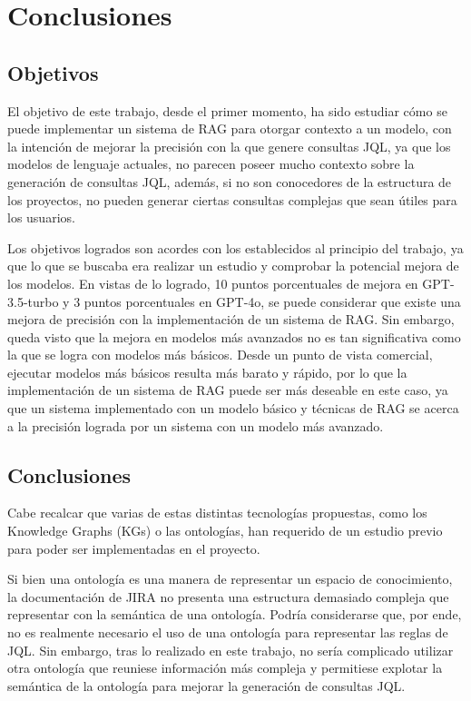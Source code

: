 \section{Conclusiones}
\subsection{Objetivos}
El objetivo de este trabajo, desde el primer momento, ha sido estudiar cómo se puede implementar un sistema de RAG para otorgar contexto a un modelo, con la intención de mejorar la precisión con la que genere consultas JQL, ya que los modelos de lenguaje actuales, no parecen poseer mucho contexto sobre la generación de consultas JQL, además, si no son conocedores de la estructura de los proyectos, no pueden generar ciertas consultas complejas que sean útiles para los usuarios.

Los objetivos logrados son acordes con los establecidos al principio del trabajo, ya que lo que se buscaba era realizar un estudio y comprobar la potencial mejora de los modelos. En vistas de lo logrado, 10 puntos porcentuales de mejora en GPT-3.5-turbo y 3 puntos porcentuales en GPT-4o, se puede considerar que existe una mejora de precisión con la implementación de un sistema de RAG. Sin embargo, queda visto que la mejora en modelos más avanzados no es tan significativa como la que se logra con modelos más básicos. Desde un punto de vista comercial, ejecutar modelos más básicos resulta más barato y rápido, por lo que la implementación de un sistema de RAG puede ser más deseable en este caso, ya que un sistema implementado con un modelo básico y técnicas de RAG se acerca a la precisión lograda por un sistema con un modelo más avanzado.

\subsection{Conclusiones}
Cabe recalcar que varias de estas distintas tecnologías propuestas, como los Knowledge Graphs (KGs) o las ontologías, han requerido de un estudio previo para poder ser implementadas en el proyecto.

Si bien una ontología es una manera de representar un espacio de conocimiento, la documentación de JIRA no presenta una estructura demasiado compleja que representar con la semántica de una ontología. Podría considerarse que, por ende, no es realmente necesario el uso de una ontología para representar las reglas de JQL. Sin embargo, tras lo realizado en este trabajo, no sería complicado utilizar otra ontología que reuniese información más compleja y permitiese explotar la semántica de la ontología para mejorar la generación de consultas JQL.


